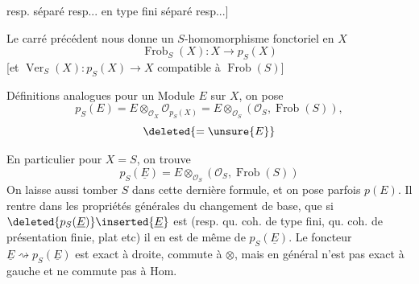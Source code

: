 resp. séparé resp... en type fini  séparé resp...]

Le carré précédent nous donne un $S$-homomorphisme
fonctoriel en $X$
\[
\operatorname{Frob}_S(X):X\longrightarrow p_S(X)
\]
[et $\operatorname{Ver}_S(X):p_S(X)\longrightarrow X$
compatible à $\operatorname{Frob}(S)$]

Définitions analogues pour un Module $E$
sur $X$, on pose
\[
p_S(E)=E\otimes_{\mathcal O_X}\mathcal O_{p_S(X)}
=E\otimes_{\mathcal O_S}(\mathcal O_S,\operatorname{Frob}(S)),
\]
\[
\deleted{=\unsure{E}}
\]

En particulier pour $X=S$, on trouve
\[
p_S(\underline E)=E\otimes_{\mathcal O_S}(\mathcal O_S,\operatorname{Frob}(S))
\]
On laisse aussi tomber $S$ dans cette dernière formule, et on pose parfois
$p(E)$.
Il rentre dans les propriétés générales du changement de base, que si
$\deleted{p_S(\underline E)}\inserted{\underline E}$ est
 (resp.  qu. coh. de type fini,
qu. coh. de présentation finie, plat etc) il en est de même de
 $p_S(\underline E)$.
Le foncteur $\underline E\rightsquigarrow p_S(\underline E)$ est exact à droite, commute
à $\otimes$, mais en général n'est pas exact à gauche et ne commute pas à Hom.

